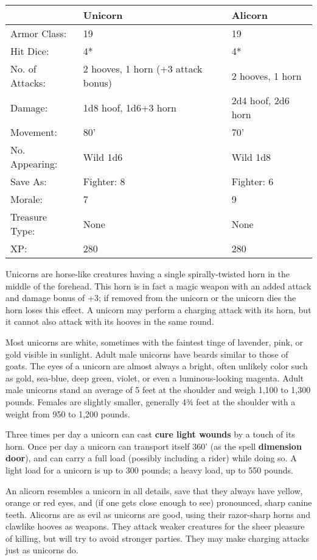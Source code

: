 \documentclass[a4paper,twoside,openany,10pt]{book}
\begin{document}
\begin{multicols}{2}
\begin{tabularx}{0.50\textwidth}{@{}lXX@{}}
 & Unicorn & Alicorn \\\hline
Armor Class: & 19 & 19 \\\hline
Hit Dice: & 4* & 4* \\\hline
No. of Attacks: & 2 hooves, 1 horn (+3 attack bonus) & 2 hooves, 1 horn \\\hline
Damage: & 1d8 hoof, 1d6+3 horn & 2d4 hoof, 2d6 horn \\\hline
Movement: & 80' & 70' \\\hline
No. Appearing: & Wild 1d6 & Wild 1d8 \\\hline
Save As: & Fighter: 8 & Fighter: 6 \\\hline
Morale: & 7 & 9 \\\hline
Treasure Type: & None & None \\\hline
XP: & 280 & 280 \\\hline
\end{tabularx}\medskip

Unicorns are horse-like creatures having a single spirally-twisted horn in the middle of the forehead. This horn is in fact a magic weapon with an added attack and damage bonus of +3; if removed from the unicorn or the unicorn dies the horn loses this effect. A unicorn may perform a charging attack with its horn, but it cannot also attack with its hooves in the same round.

Most unicorns are white, sometimes with the faintest tinge of lavender, pink, or gold visible in sunlight. Adult male unicorns have beards similar to those of goats. The eyes of a unicorn are almost always a bright, often unlikely color such as gold, sea-blue, deep green, violet, or even a luminous-looking magenta. Adult male unicorns stand an average of 5 feet at the shoulder and weigh 1,100 to 1,300 pounds. Females are slightly smaller, generally 4¾ feet at the shoulder with a weight from 950 to 1,200 pounds.

Three times per day a unicorn can cast \textbf{cure light wounds }by a touch of its horn. Once per day a unicorn can transport itself 360' (as the spell \textbf{dimension door}), and can carry a full load (possibly including a rider) while doing so. A light load for a unicorn is up to 300 pounds; a heavy load, up to 550 pounds.

An alicorn resembles a unicorn in all details, save that they always have yellow, orange or red eyes, and (if one gets close enough to see) pronounced, sharp canine teeth. Alicorns are as evil as unicorns are good, using their razor-sharp horns and clawlike hooves as weapons. They attack weaker creatures for the sheer pleasure of killing, but will try to avoid stronger parties. They may make charging attacks just as unicorns do.


\end{multicols}
\end{document}
